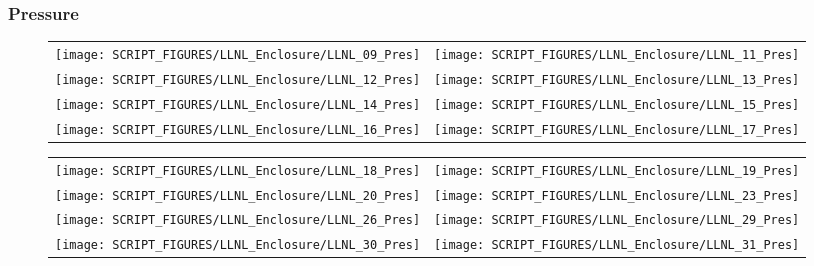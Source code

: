 \clearpage

\subsubsection{Pressure}

\begin{figure}[!ht]
\begin{tabular*}{\textwidth}{l@{\extracolsep{\fill}}r}
\texttt{[image: SCRIPT\_FIGURES/LLNL\_Enclosure/LLNL\_09\_Pres]} &
\texttt{[image: SCRIPT\_FIGURES/LLNL\_Enclosure/LLNL\_11\_Pres]} \\
\texttt{[image: SCRIPT\_FIGURES/LLNL\_Enclosure/LLNL\_12\_Pres]} &
\texttt{[image: SCRIPT\_FIGURES/LLNL\_Enclosure/LLNL\_13\_Pres]} \\
\texttt{[image: SCRIPT\_FIGURES/LLNL\_Enclosure/LLNL\_14\_Pres]} &
\texttt{[image: SCRIPT\_FIGURES/LLNL\_Enclosure/LLNL\_15\_Pres]} \\
\texttt{[image: SCRIPT\_FIGURES/LLNL\_Enclosure/LLNL\_16\_Pres]} &
\texttt{[image: SCRIPT\_FIGURES/LLNL\_Enclosure/LLNL\_17\_Pres]}
\end{tabular*}
\label{LLNL_Enclosure_Pres_2}
\end{figure}

\begin{figure}[!ht]
\begin{tabular*}{\textwidth}{l@{\extracolsep{\fill}}r}
\texttt{[image: SCRIPT\_FIGURES/LLNL\_Enclosure/LLNL\_18\_Pres]} &
\texttt{[image: SCRIPT\_FIGURES/LLNL\_Enclosure/LLNL\_19\_Pres]} \\
\texttt{[image: SCRIPT\_FIGURES/LLNL\_Enclosure/LLNL\_20\_Pres]} &
\texttt{[image: SCRIPT\_FIGURES/LLNL\_Enclosure/LLNL\_23\_Pres]} \\
\texttt{[image: SCRIPT\_FIGURES/LLNL\_Enclosure/LLNL\_26\_Pres]} &
\texttt{[image: SCRIPT\_FIGURES/LLNL\_Enclosure/LLNL\_29\_Pres]} \\
\texttt{[image: SCRIPT\_FIGURES/LLNL\_Enclosure/LLNL\_30\_Pres]} &
\texttt{[image: SCRIPT\_FIGURES/LLNL\_Enclosure/LLNL\_31\_Pres]}
\end{tabular*}
\label{LLNL_Enclosure_Pres_3}
\end{figure}

